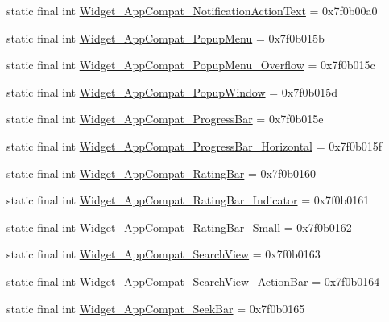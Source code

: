 \begin{CompactItemize}
\item 
static final int \hyperlink{classandroid_1_1support_1_1graphics_1_1drawable_1_1_r_1_1style_5a73bd386a3a31b9bbf2e11fa5cb546c}{Widget\_\-AppCompat\_\-NotificationActionText} = 0x7f0b00a0
\item 
static final int \hyperlink{classandroid_1_1support_1_1graphics_1_1drawable_1_1_r_1_1style_10c47406b2afe569bda4cf725ff21556}{Widget\_\-AppCompat\_\-PopupMenu} = 0x7f0b015b
\item 
static final int \hyperlink{classandroid_1_1support_1_1graphics_1_1drawable_1_1_r_1_1style_c3c823b2534e0de1e79fa232f7e9e950}{Widget\_\-AppCompat\_\-PopupMenu\_\-Overflow} = 0x7f0b015c
\item 
static final int \hyperlink{classandroid_1_1support_1_1graphics_1_1drawable_1_1_r_1_1style_bf368aa2c39048b52f1f5c9722c4830d}{Widget\_\-AppCompat\_\-PopupWindow} = 0x7f0b015d
\item 
static final int \hyperlink{classandroid_1_1support_1_1graphics_1_1drawable_1_1_r_1_1style_a977977f6bd5fa59cd4f51bc9511cf69}{Widget\_\-AppCompat\_\-ProgressBar} = 0x7f0b015e
\item 
static final int \hyperlink{classandroid_1_1support_1_1graphics_1_1drawable_1_1_r_1_1style_3db48337a94d57c81ee1aca54095f939}{Widget\_\-AppCompat\_\-ProgressBar\_\-Horizontal} = 0x7f0b015f
\item 
static final int \hyperlink{classandroid_1_1support_1_1graphics_1_1drawable_1_1_r_1_1style_9f4298c75528f23d62a8c4489d3581a5}{Widget\_\-AppCompat\_\-RatingBar} = 0x7f0b0160
\item 
static final int \hyperlink{classandroid_1_1support_1_1graphics_1_1drawable_1_1_r_1_1style_aeef7605bf21ed3d901d7757bfdeb5f8}{Widget\_\-AppCompat\_\-RatingBar\_\-Indicator} = 0x7f0b0161
\item 
static final int \hyperlink{classandroid_1_1support_1_1graphics_1_1drawable_1_1_r_1_1style_b839c72fa7fa86f5f9f8d1e1d6dbd2bb}{Widget\_\-AppCompat\_\-RatingBar\_\-Small} = 0x7f0b0162
\item 
static final int \hyperlink{classandroid_1_1support_1_1graphics_1_1drawable_1_1_r_1_1style_1fbdeb43f10a07f9ed770599a3c7bd61}{Widget\_\-AppCompat\_\-SearchView} = 0x7f0b0163
\item 
static final int \hyperlink{classandroid_1_1support_1_1graphics_1_1drawable_1_1_r_1_1style_c3c38c67589d75c140164e446f920cb8}{Widget\_\-AppCompat\_\-SearchView\_\-ActionBar} = 0x7f0b0164
\item 
static final int \hyperlink{classandroid_1_1support_1_1graphics_1_1drawable_1_1_r_1_1style_0a68b3a3d82177ef5671fc2d35606f0f}{Widget\_\-AppCompat\_\-SeekBar} = 0x7f0b0165

\end{CompactItemize}
